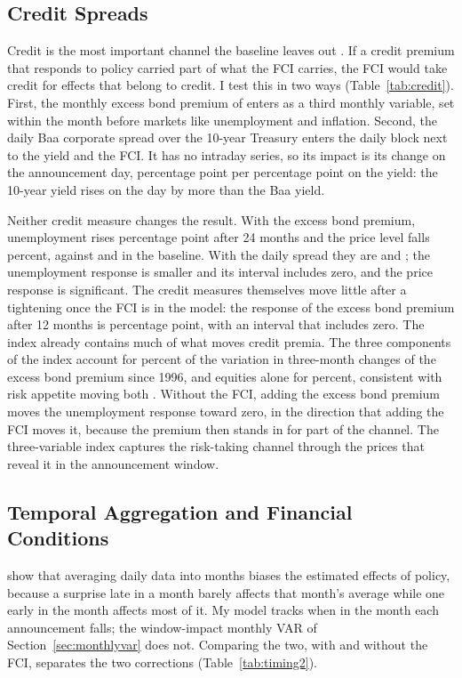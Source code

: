 \documentclass[11pt]{article}
\begin{document}
\subsection{Credit Spreads}\label{sec:credit}
Credit is the most important channel the baseline leaves out \citep{gertler2015,gilchrist2012,caldara2019}. If a credit premium that responds to policy carried part of what the FCI carries, the FCI would take credit for effects that belong to credit. I test this in two ways (Table~\ref{tab:credit}). First, the monthly excess bond premium of \citet{gilchrist2012} enters as a third monthly variable, set within the month before markets like unemployment and inflation. Second, the daily Baa corporate spread over the 10-year Treasury enters the daily block next to the yield and the FCI. It has no intraday series, so its impact is its change on the announcement day,  percentage point per percentage point on the yield: the 10-year yield rises on the day by more than the Baa yield.



Neither credit measure changes the result. With the excess bond premium, unemployment rises  percentage point after 24 months and the price level falls  percent, against  and  in the baseline. With the daily spread they are  and ; the unemployment response is smaller and its interval includes zero, and the price response is significant. The credit measures themselves move little after a tightening once the FCI is in the model: the response of the excess bond premium after 12 months is  percentage point, with an interval that includes zero. The index already contains much of what moves credit premia. The three components of the index account for  percent of the variation in three-month changes of the excess bond premium since 1996, and equities alone for  percent, consistent with risk appetite moving both \citep{bauer2026}. Without the FCI, adding the excess bond premium moves the unemployment response toward zero, in the direction that adding the FCI moves it, because the premium then stands in for part of the channel. The three-variable index captures the risk-taking channel through the prices that reveal it in the announcement window.

\subsection{Temporal Aggregation and Financial Conditions}\label{sec:timingtest}
\citet{jacobson2026} show that averaging daily data into months biases the estimated effects of policy, because a surprise late in a month barely affects that month's average while one early in the month affects most of it. My model tracks when in the month each announcement falls; the window-impact monthly VAR of Section~\ref{sec:monthlyvar} does not. Comparing the two, with and without the FCI, separates the two corrections (Table~\ref{tab:timing2}).
\end{document}
